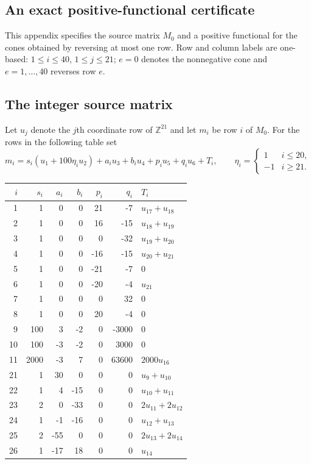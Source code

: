 \documentclass[11pt]{article}
\theoremstyle{remark}
\begin{document}
\begin{appendices}
\section{An exact positive-functional certificate}\label{app:certificate}
This appendix specifies the source matrix $M_0$ and a positive functional
for the cones obtained by reversing at most one row. Row and column labels
are one-based: $1\le i\le40$, $1\le j\le21$; $e=0$ denotes the
nonnegative cone and $e=1,\ldots,40$ reverses row $e$.

\subsection*{The integer source matrix}
Let $u_j$ denote the $j$th coordinate row of $\mathbb Z^{21}$ and let $m_i$
be row $i$ of $M_0$. For the rows in the following table set
\[
 m_i=s_i(u_1+100\eta_i u_2)+a_i u_3+b_i u_4+p_i u_5+q_i u_6+T_i,
 \qquad \eta_i=\begin{cases}1&i\le20,\\-1&i\ge21.\end{cases}
\]
\begin{center}\small
\setlength{\tabcolsep}{7pt}
\begin{tabular}{r|rrrrr|l}
$i$&$s_i$&$a_i$&$b_i$&$p_i$&$q_i$&$T_i$\\\hline
1&1&0&0&21&-7&$u_{17}+u_{18}$\\
2&1&0&0&16&-15&$u_{18}+u_{19}$\\
3&1&0&0&0&-32&$u_{19}+u_{20}$\\
4&1&0&0&-16&-15&$u_{20}+u_{21}$\\
5&1&0&0&-21&-7&$0$\\
6&1&0&0&-20&-4&$u_{21}$\\
7&1&0&0&0&32&$0$\\
8&1&0&0&20&-4&$0$\\
9&100&3&-2&0&-3000&$0$\\
10&100&-3&-2&0&3000&$0$\\
11&2000&-3&7&0&63600&$2000u_{16}$\\
21&1&30&0&0&0&$u_{9}+u_{10}$\\
22&1&4&-15&0&0&$u_{10}+u_{11}$\\
23&2&0&-33&0&0&$2u_{11}+2u_{12}$\\
24&1&-1&-16&0&0&$u_{12}+u_{13}$\\
25&2&-55&0&0&0&$2u_{13}+2u_{14}$\\
26&1&-17&18&0&0&$u_{14}$\\

\end{tabular}
\end{center}
\end{appendices}
\end{document}
